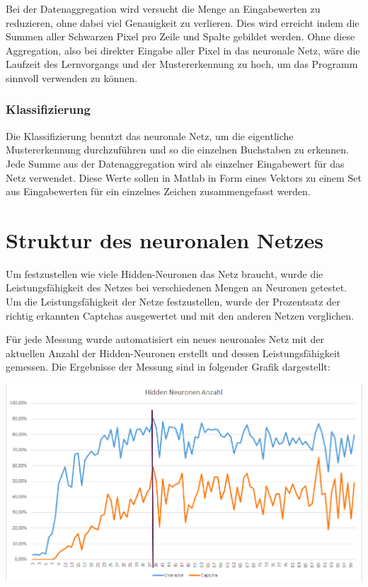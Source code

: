 Bei der Datenaggregation wird versucht die Menge an Eingabewerten zu reduzieren,
ohne dabei viel Genauigkeit zu verlieren. Dies wird erreicht indem 
die Summen aller Schwarzen Pixel pro Zeile und Spalte gebildet werden. Ohne diese Aggregation, also bei direkter Eingabe aller Pixel in das
neuronale Netz, wäre die Laufzeit des Lernvorgangs und der Mustererkennung zu
hoch, um das Programm sinnvoll verwenden zu können.
\subsubsection{Klassifizierung}

Die Klassifizierung benutzt das neuronale Netz, um die eigentliche
Mustererkennung durchzuführen und so die einzelnen Buchstaben zu
erkennen. Jede Summe aus der Datenaggregation wird als einzelner Eingabewert
für das Netz verwendet. Diese Werte sollen in Matlab in Form eines Vektors zu
einem Set aus Eingabewerten für ein einzelnes Zeichen zusammengefasst werden.

\newpage
\section{Struktur des neuronalen Netzes}

Um festzustellen wie viele Hidden-Neuronen das Netz braucht, wurde die
Leistungsfähigkeit des Netzes bei verschiedenen Mengen an Neuronen getestet.
Um die Leistungsfähigkeit der Netze festzustellen, wurde der Prozentsatz der richtig
erkannten Captchas ausgewertet und mit den anderen Netzen verglichen. 

Für jede Messung wurde automatisiert ein neues neuronales Netz mit der aktuellen
Anzahl der Hidden-Neuronen erstellt und dessen Leistungsfähigkeit gemessen.
Die Ergebnisse der Messung sind in folgender Grafik dargestellt:

\includegraphics[width=14cm]{res/performance.png}

